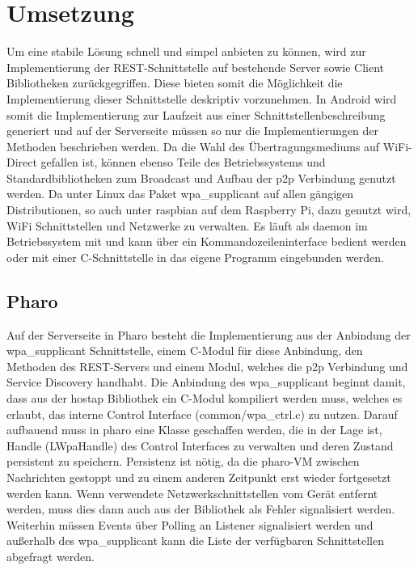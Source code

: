 \section{Umsetzung}
	Um eine stabile Lösung schnell und simpel anbieten zu können, wird zur Implementierung der REST-Schnittstelle auf bestehende Server sowie Client Bibliotheken zurückgegriffen. Diese bieten somit die Möglichkeit die Implementierung dieser Schnittstelle deskriptiv vorzunehmen. In Android wird somit die Implementierung zur Laufzeit aus einer Schnittstellenbeschreibung generiert und auf der Serverseite müssen so nur die Implementierungen der Methoden beschrieben werden. Da die Wahl des Übertragungsmediums auf WiFi-Direct gefallen ist, können ebenso Teile des Betriebssystems und Standardbibliotheken zum Broadcast und Aufbau der p2p Verbindung genutzt werden.
	Da unter Linux das Paket wpa\_supplicant \cite{wpaSupplicant} auf allen gängigen Distributionen, so auch unter raspbian auf dem Raspberry Pi, dazu genutzt wird, WiFi Schnittstellen und Netzwerke zu verwalten. Es läuft als daemon im Betriebssystem mit und kann über ein Kommandozeileninterface bedient werden oder mit einer C-Schnittstelle in das eigene Programm eingebunden werden.
	\subsection{Pharo}
		Auf der Serverseite in Pharo besteht die Implementierung aus der Anbindung der wpa\_supplicant Schnittstelle, einem C-Modul für diese Anbindung, den Methoden des REST-Servers und einem Modul, welches die p2p Verbindung und Service Discovery handhabt.
		Die Anbindung des wpa\_supplicant beginnt damit, dass aus der hostap \cite{hostAp} Bibliothek ein C-Modul kompiliert werden muss, welches es erlaubt, das interne Control Interface (common/wpa\_ctrl.c) zu nutzen. Darauf aufbauend muss in pharo eine Klasse geschaffen werden, die in der Lage ist, Handle (LWpaHandle) des Control Interfaces zu verwalten und deren Zustand persistent zu speichern. Persistenz ist nötig, da die pharo-VM zwischen Nachrichten gestoppt und zu einem anderen Zeitpunkt erst wieder fortgesetzt werden kann. Wenn verwendete Netzwerkschnittstellen vom Gerät entfernt werden, muss dies dann auch aus der Bibliothek als Fehler signalisiert werden. Weiterhin müssen Events über Polling an Listener signalisiert werden und außerhalb des wpa\_supplicant kann die Liste der verfügbaren Schnittstellen abgefragt werden.
		
